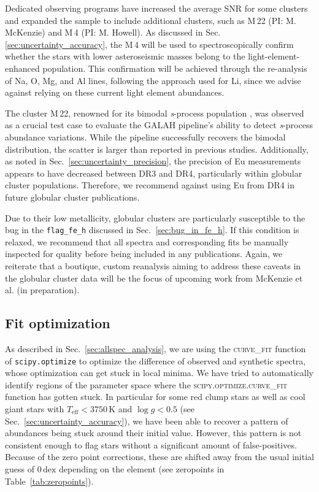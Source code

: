 \documentclass[
  journal=pasa,
  manuscript=research-paper, %
  year=2024,
  volume=37
]{cup-journal}
\begin{document}
Dedicated observing programs have increased the average SNR for some clusters and expanded the sample to include additional clusters, such as M\,22 (PI: M. McKenzie) and M\,4 (PI: M. Howell). As discussed in Sec. \ref{sec:uncertainty_accuracy}, the M\,4 will be used to spectroscopically confirm whether the stars with lower asteroseismic masses belong to the light-element-enhanced population. This confirmation will be achieved through the re-analysis of Na, O, Mg, and Al lines, following the approach used for Li, since we advise against relying on these current light element abundances.

The cluster M\,22, renowned for its bimodal \textit{s}-process population \citep{Marino2011, McKenzie2022, McKenzie2024}, was observed as a crucial test case to evaluate the GALAH pipeline's ability to detect \textit{s}-process abundance variations. While the pipeline successfully recovers the bimodal distribution, the scatter is larger than reported in previous studies. Additionally, as noted in Sec.~\ref{sec:uncertainty_precision}, the precision of Eu measurements appears to have decreased between DR3 and DR4, particularly within globular cluster populations. Therefore, we recommend against using Eu from DR4 in future globular cluster publications.

Due to their low metallicity, globular clusters are particularly susceptible to the bug in the \texttt{flag\_fe\_h} discussed in Sec.~\ref{sec:bug_in_fe_h}. If this condition is relaxed, we recommend that all spectra and corresponding fits be manually inspected for quality before being included in any publications. Again, we reiterate that a boutique, custom reanalysis aiming to address these caveats in the globular cluster data will be the focus of upcoming work from McKenzie et al. (in preparation).

\subsection{Fit optimization} \label{sec:caveats_fitting}

As described in Sec.~\ref{sec:allspec_analysis}, we are using the \textsc{curve\_fit} function of \texttt{scipy.optimize} \citep{scipy} to optimize the difference of observed and synthetic spectra, whose optimization can get stuck in local minima. We have tried to automatically identify regions of the parameter space where the \textsc{scipy.optimize.curve\_fit} function has gotten stuck. In particular for some red clump stars as well as cool giant stars with $T_\mathrm{eff} < 3750\,\mathrm{K}$ and $\log g < 0.5$ (see Sec.~\ref{sec:uncertainty_accuracy}), we have been able to recover a pattern of abundances being stuck around their initial value. However, this pattern is not consistent enough to flag stars without a significant amount of false-positives. Because of the zero point corrections, these are shifted away from the usual initial guess of $0\,\mathrm{dex}$ depending on the element (see zeropoints in Table~\ref{tab:zeropoints}).
\end{document}
